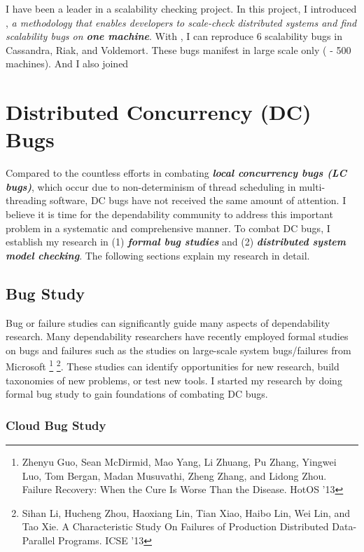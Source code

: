 \documentclass[11pt]{article}
\begin{document}
I have been a leader in a
scalability checking project. In this project, I introduced \sck, \textit{a
methodology that enables developers to scale-check distributed systems and find
scalability bugs on \textbf{one machine}}. 
With \sck, I can reproduce 6
scalability bugs in Cassandra, Riak, and Voldemort. These bugs manifest in large
scale only ( - 500 machines). And I also joined 
\fi

\section{Distributed Concurrency (DC) Bugs}\label{dcbugs}

Compared to the countless efforts in combating \textbf{\textit{local
concurrency bugs (LC bugs)}}, which occur due to non-determinism of thread
scheduling in multi-threading software, DC bugs have not received the same
amount of attention. I believe it is time for the dependability community to
address this important problem in a systematic and comprehensive manner. To
combat DC bugs, I establish my research in (1) \textbf{\textit{formal bug
studies}} and (2) \textbf{\textit{distributed system model checking}}. The
following sections explain my research in detail.

\subsection{Bug Study}

Bug or failure studies can significantly guide many aspects of dependability
research. Many dependability researchers have recently employed formal studies
on bugs and failures such as the studies on large-scale system bugs/failures
from Microsoft \footnote{Zhenyu Guo, Sean McDirmid, Mao Yang, Li Zhuang, Pu
Zhang, Yingwei Luo, Tom Bergan, Madan Musuvathi, Zheng Zhang, and Lidong Zhou.
Failure Recovery: When the Cure Is Worse Than the Disease. HotOS '13}
\footnote{Sihan Li, Hucheng Zhou, Haoxiang Lin, Tian Xiao, Haibo Lin, Wei Lin,
and Tao Xie. A Characteristic Study On Failures of Production Distributed
Data-Parallel Programs. ICSE '13}. These studies can identify opportunities for
new research, build taxonomies of new problems, or test new tools. I started my
research by doing formal bug study to gain foundations of combating DC bugs.

\subsubsection{Cloud Bug Study}
\end{document}
